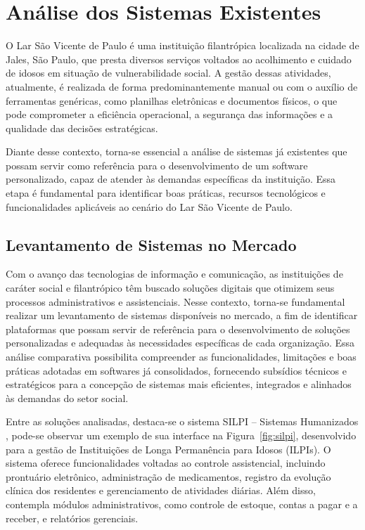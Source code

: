 \section{Análise dos Sistemas Existentes}

O Lar São Vicente de Paulo é uma instituição filantrópica localizada na cidade de Jales, São Paulo, que presta diversos serviços voltados ao acolhimento e cuidado de idosos em situação de vulnerabilidade social. A gestão dessas atividades, atualmente, é realizada de forma predominantemente manual ou com o auxílio de ferramentas genéricas, como planilhas eletrônicas e documentos físicos, o que pode comprometer a eficiência operacional, a segurança das informações e a qualidade das decisões estratégicas.

Diante desse contexto, torna-se essencial a análise de sistemas já existentes que possam servir como referência para o desenvolvimento de um software personalizado, capaz de atender às demandas específicas da instituição. Essa etapa é fundamental para identificar boas práticas, recursos tecnológicos e funcionalidades aplicáveis ao cenário do Lar São Vicente de Paulo.

\subsection{Levantamento de Sistemas no Mercado}

Com o avanço das tecnologias de informação e comunicação, as instituições de caráter social e filantrópico têm buscado soluções digitais que otimizem seus processos administrativos e assistenciais. Nesse contexto, torna-se fundamental realizar um levantamento de sistemas disponíveis no mercado, a fim de identificar plataformas que possam servir de referência para o desenvolvimento de soluções personalizadas e adequadas às necessidades específicas de cada organização. Essa análise comparativa possibilita compreender as funcionalidades, limitações e boas práticas adotadas em softwares já consolidados, fornecendo subsídios técnicos e estratégicos para a concepção de sistemas mais eficientes, integrados e alinhados às demandas do setor social.

Entre as soluções analisadas, destaca-se o sistema SILPI – Sistemas Humanizados \parencite{silpi2025}, pode-se observar um exemplo de sua interface na Figura~\ref{fig:silpi}, desenvolvido para a gestão de Instituições de Longa Permanência para Idosos (ILPIs). O sistema oferece funcionalidades voltadas ao controle assistencial, incluindo prontuário eletrônico, administração de medicamentos, registro da evolução clínica dos residentes e gerenciamento de atividades diárias. Além disso, contempla módulos administrativos, como controle de estoque, contas a pagar e a receber, e relatórios gerenciais.  

